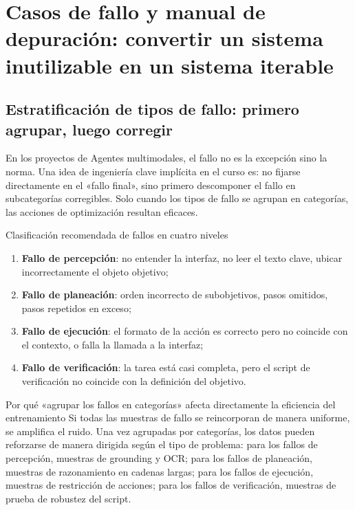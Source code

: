 \documentclass[a4paper]{article}
\begin{document}
\section{Casos de fallo y manual de depuración: convertir un sistema inutilizable en un sistema iterable}

\subsection{Estratificación de tipos de fallo: primero agrupar, luego corregir}
En los proyectos de Agentes multimodales, el fallo no es la excepción sino la norma. Una idea de ingeniería clave implícita en el curso es: no fijarse directamente en el «fallo final», sino primero descomponer el fallo en subcategorías corregibles. Solo cuando los tipos de fallo se agrupan en categorías, las acciones de optimización resultan eficaces.

\begin{importantbox}{Clasificación recomendada de fallos en cuatro niveles}
\begin{enumerate}
    \item \textbf{Fallo de percepción}: no entender la interfaz, no leer el texto clave, ubicar incorrectamente el objeto objetivo;
    \item \textbf{Fallo de planeación}: orden incorrecto de subobjetivos, pasos omitidos, pasos repetidos en exceso;
    \item \textbf{Fallo de ejecución}: el formato de la acción es correcto pero no coincide con el contexto, o falla la llamada a la interfaz;
    \item \textbf{Fallo de verificación}: la tarea está casi completa, pero el script de verificación no coincide con la definición del objetivo.
\end{enumerate}
\end{importantbox}

\begin{knowledgebox}{Por qué «agrupar los fallos en categorías» afecta directamente la eficiencia del entrenamiento}
Si todas las muestras de fallo se reincorporan de manera uniforme, se amplifica el ruido. Una vez agrupadas por categorías, los datos pueden reforzarse de manera dirigida según el tipo de problema: para los fallos de percepción, muestras de grounding y OCR; para los fallos de planeación, muestras de razonamiento en cadenas largas; para los fallos de ejecución, muestras de restricción de acciones; para los fallos de verificación, muestras de prueba de robustez del script.
\end{knowledgebox}
\end{document}
